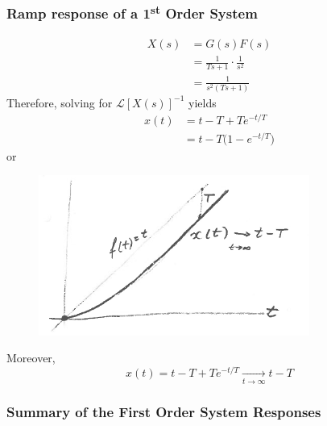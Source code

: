 \documentclass[12pt,letter]{article}
\numberwithin{ex}{section} %
\numberwithin{re}{section} %
\newcommand{\Laplace}[1]{\ensuremath{\mathcal{L}{\left[#1\right]}}}
\numberwithin{equation}{section}	%
\begin{document}
\subsubsection{Ramp response of a 1\textsuperscript{st} Order System}


\begin{align}
X(s) &= G(s)F(s) \\
&= \frac{1}{Ts+1} \cdot \frac{1}{s^2} \nonumber \\
&= \frac{1}{s^2(Ts+1)}
\end{align}
Therefore, solving for $\Laplace{X(s)}^{-1}$ yields
\begin{align}
x(t) &= t - T + Te^{-t/T} \nonumber \\
&= t - T\big(1-e^{-t/T}\big)
\end{align}
or
\begin{figure}[H]
	\centering
	\includegraphics[width=3.5in]{../figures/x_t_ramp_time_response}
\end{figure}
Moreover, 
\begin{equation}
x(t) = t-T+Te^{-t/T}  \xrightarrow[t \rightarrow \infty]{} t-T
\end{equation}

\subsubsection{Summary of the First Order System Responses}
\end{document}
